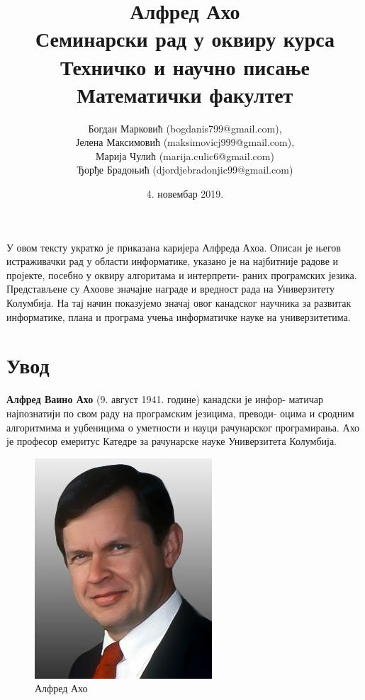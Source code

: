 \documentclass[a4paper]{article}
\begin{document}
\title{Алфред Ахо\\ \small{Семинарски рад у оквиру курса\\Техничко и научно писање\\Математички факултет}}

\author{Богдан Марковић (bogdanis799@gmail.com),\\Јелена Максимовић (maksimovicj999@gmail.com),\\ Марија Чулић (marija.culic6@gmail.com)\\ Ђорђе Брадоњић (djordjebradonjic99@gmail.com)\\}
\date{4. новембар 2019.}
\maketitle

\abstract

У овом тексту укратко је приказана каријера Алфреда Ахоа. Описан је његов истраживачки рад у области информатике, указано је на најбитније радове и пројекте, посебно у оквиру алгоритама и интерпрети-
раних програмских језика. Представљене су Ахоове значајне награде и вредност рада на Универзитету Колумбија. На тај начин показујемо значај овог канадског научника за развитак информатике, плана и програма учења информатичке науке на универзитетима.

\tableofcontents

\newpage

\section{Увод}
\label{sec:uvod}
\textbf{Алфред Ваино Ахо} (9. август 1941. године) канадски је инфор-
матичар најпознатији по свом раду на програмским језицима, преводи-
оцима и сродним алгоритмима и уџбеницима о уметности и науци рачунарског програмирања. Ахо је професор емеритус Катедре за рачунарске науке Универзитета Колумбија.\cite{aav1968}\cite{3}\cite{4}\cite{5}\cite{6}\cite{7}\cite{8}\cite{9}\cite{10}

\begin{figure}[h!]
\begin{center}
\includegraphics[scale=1.75]{AlfredAhoPortrait.jpg}
\end{center}
\caption{Алфред Ахо}
\end{figure}
\end{document}
